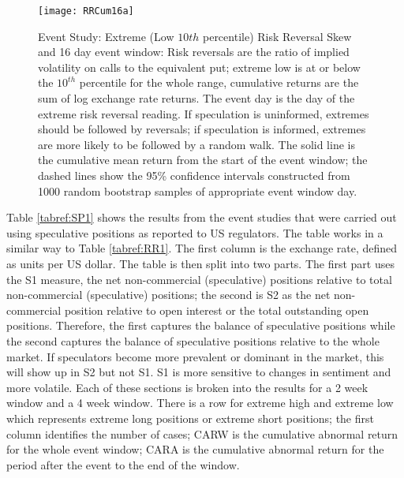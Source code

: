 \documentclass[ijfs,article,submit,oneauthor,pdftex,10pt,a4paper]{mdpi}
\begin{document}
{\begin{figure}
\graphicspath{{../Figures/}}
\centering
\texttt{[image: RRCum16a]}
\caption{Event Study: Extreme (Low $10{th}$ percentile) Risk Reversal Skew and 16 day event window: Risk reversals are the ratio of implied volatility on calls to the equivalent put; extreme low is at or below the $10^{th}$ percentile for the whole range, cumulative returns are the sum of log exchange rate returns. The event day is the day of the extreme risk reversal reading.  If speculation is uninformed, extremes should be followed by reversals; if speculation is informed, extremes are more likely to be followed by a random walk. The solid line is the cumulative mean return from the start of the event window; the dashed lines show the 95\% confidence intervals constructed from 1000 random bootstrap samples of appropriate event window day.}
\label{fig:ES2}
\end{figure}

Table \ref{tabref:SP1} shows the results from the event studies that were carried out using speculative positions as reported to US regulators.  The table works in a similar way to Table \ref{tabref:RR1}.  The first column is the exchange rate, defined as units per US dollar.  The table is then split into two parts.  The first part uses the S1 measure, the net non-commercial (speculative) positions relative to total non-commercial (speculative) positions; the second is S2 as the net non-commercial position relative to open interest or the total outstanding open positions.  Therefore, the first captures the balance of speculative positions while the second captures the balance of speculative positions relative to the whole market.  If speculators become more prevalent or dominant in the market, this will show up in S2 but not S1.  S1 is more sensitive to changes in sentiment and more volatile. Each of these sections is broken into the results for a 2 week window and a 4 week window.  There is a row for extreme high and extreme low which represents extreme long positions or extreme short positions; the first  column identifies the number of cases; CARW is the cumulative abnormal return for the whole event window; CARA is the cumulative abnormal return for the period after the event to the end of the window.     

}
\end{document}
